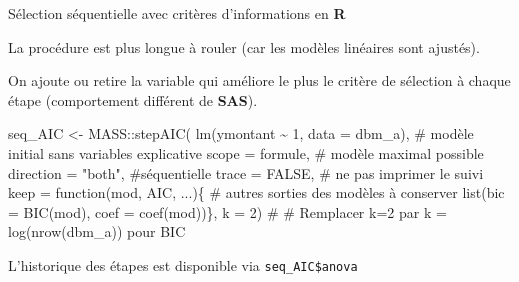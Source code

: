\documentclass[
  ignorenonframetext,
]{beamer}
\newenvironment{Shaded}{\begin{snugshade}}{\end{snugshade}}
\newcommand{\AttributeTok}[1]{\textcolor[rgb]{0.40,0.45,0.13}{#1}}
\newcommand{\CommentTok}[1]{\textcolor[rgb]{0.37,0.37,0.37}{#1}}
\newcommand{\ConstantTok}[1]{\textcolor[rgb]{0.56,0.35,0.01}{#1}}
\newcommand{\ControlFlowTok}[1]{\textcolor[rgb]{0.00,0.23,0.31}{#1}}
\newcommand{\DecValTok}[1]{\textcolor[rgb]{0.68,0.00,0.00}{#1}}
\newcommand{\FunctionTok}[1]{\textcolor[rgb]{0.28,0.35,0.67}{#1}}
\newcommand{\NormalTok}[1]{\textcolor[rgb]{0.00,0.23,0.31}{#1}}
\newcommand{\OtherTok}[1]{\textcolor[rgb]{0.00,0.23,0.31}{#1}}
\newcommand{\SpecialCharTok}[1]{\textcolor[rgb]{0.37,0.37,0.37}{#1}}
\newcommand{\StringTok}[1]{\textcolor[rgb]{0.13,0.47,0.30}{#1}}
\begin{document}
\begin{frame}[fragile]{Sélection séquentielle avec critères
d'informations en \textbf{R}}
\protect\hypertarget{suxe9lection-suxe9quentielle-avec-crituxe8res-dinformations-en-r}{}
\footnotesize

La procédure est plus longue à rouler (car les modèles linéaires sont
ajustés).

On ajoute ou retire la variable qui améliore le plus le critère de
sélection à chaque étape (comportement différent de \textbf{SAS}).

\begin{Shaded}
\begin{Highlighting}[numbers=left,,]
\NormalTok{seq\_AIC }\OtherTok{\textless{}{-}}\NormalTok{ MASS}\SpecialCharTok{::}\FunctionTok{stepAIC}\NormalTok{(}
  \FunctionTok{lm}\NormalTok{(ymontant }\SpecialCharTok{\textasciitilde{}} \DecValTok{1}\NormalTok{, }\AttributeTok{data =}\NormalTok{ dbm\_a), }
  \CommentTok{\# modèle initial sans variables explicative}
    \AttributeTok{scope =}\NormalTok{ formule, }\CommentTok{\# modèle maximal possible}
    \AttributeTok{direction =} \StringTok{"both"}\NormalTok{, }\CommentTok{\#séquentielle}
    \AttributeTok{trace =} \ConstantTok{FALSE}\NormalTok{, }\CommentTok{\# ne pas imprimer le suivi}
    \AttributeTok{keep =} \ControlFlowTok{function}\NormalTok{(mod, AIC, ...)\{ }
      \CommentTok{\# autres sorties des modèles à conserver}
      \FunctionTok{list}\NormalTok{(}\AttributeTok{bic =} \FunctionTok{BIC}\NormalTok{(mod), }
           \AttributeTok{coef =} \FunctionTok{coef}\NormalTok{(mod))\},}
    \AttributeTok{k =} \DecValTok{2}\NormalTok{) }\CommentTok{\#}
\CommentTok{\# Remplacer k=2 par k = log(nrow(dbm\_a)) pour BIC}
\end{Highlighting}
\end{Shaded}

L'historique des étapes est disponible via \texttt{seq\_AIC\$anova}

\normalsize
\end{frame}
\end{document}
